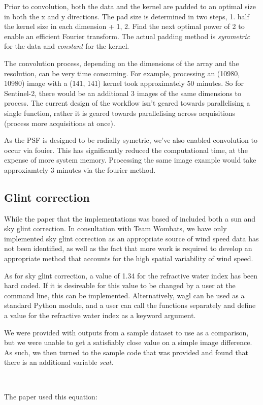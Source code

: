 \documentclass[a4paper]{article}
\begin{document}
\begin{flushleft}
    \clearpage

      Prior to convolution, both the data and the kernel are padded to an optimal size in both the x and y directions. The pad size is determined in two steps, 1. half the kernel size in each dimension + 1, 2. Find the next optimal power of 2 to enable an efficient Fourier transform. The actual padding method is \textit{symmetric} for the data and \textit{constant} for the kernel. \par
      The convolution process, depending on the dimensions of the array and the resolution, can be very time consuming. For example, processing an (10980, 10980) image with a (141, 141) kernel took approximately 50 minutes. So for Sentinel-2, there would be an additional 3 images of the same dimensions to process. The current design of the workflow isn't geared towards parallelising a single function, rather it is geared towards parallelising across acquisitions (process more acquisitions at once). \par
      As the PSF is designed to be radially symetric, we've also enabled convolution to occur via fouier. This has significantly reduced the computational time, at the expense of more system memory. Processing the same image example would take approxiamtely 3 minutes via the fourier method.
    \end{flushleft}

  \subsection{Glint correction}

    \begin{flushleft}
      While the paper that the implementations was based of included both a sun and sky glint correction. In consultation with Team Wombats, we have only implemented sky glint correction as an appropriate source of wind speed data has not been identified, as well as the fact that more work is required to develop an appropriate method that accounts for the high spatial variability of wind speed. \par
      As for sky glint correction, a value of 1.34 for the refractive water index has been hard coded. If it is desireable for this value to be changed by a user at the command line, this can be implemented. Alternatively, wagl can be used as a standard Python module, and a user can call the functions separately and define a value for the refractive water index as a keyword argument. \par
      We were provided with outputs from a sample dataset to use as a comparison, but we were unable to get a satisfiably close value on a simple image difference. As such, we then turned to the sample code that was provided and found that there is an additional variable \textit{scat}. \par
\(\phantom{0}\)
      \par
      The paper used this equation: 
    \end{flushleft}
\end{document}
